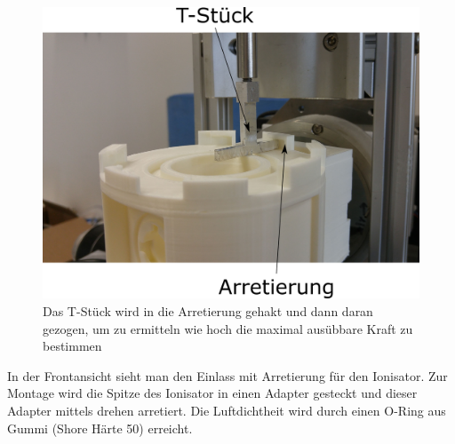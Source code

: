 \begin{figure}[h]
	\begin{center}
		\includegraphics[scale=0.6]{Messmethode_Zugkraft.png}
		\caption{Das T-Stück wird in die Arretierung gehakt und dann daran gezogen, um zu ermitteln wie hoch die maximal ausübbare Kraft zu bestimmen}
	\end{center}
\end{figure}


In der Frontansicht sieht man den Einlass mit Arretierung für den Ionisator. Zur Montage wird die Spitze des Ionisator in einen Adapter gesteckt und dieser Adapter mittels drehen arretiert. Die Luftdichtheit wird durch einen O-Ring aus Gummi (Shore Härte 50) erreicht. \\

